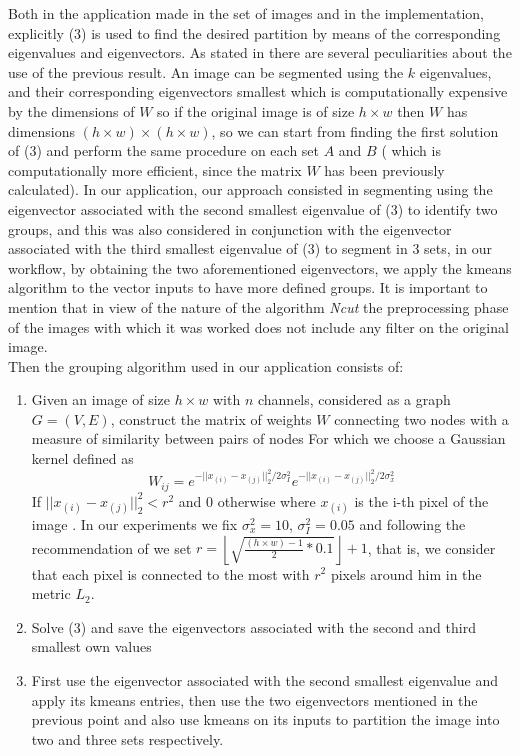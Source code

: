 \documentclass[conference]{IEEEtran}
\begin{document}
Both in the application made in the set of images and in the implementation, explicitly (3) is used to find the desired partition by means of the corresponding eigenvalues and eigenvectors. As stated in \cite{Ncut} there are several peculiarities about the use of the previous result. An image can be segmented using the $ k $ eigenvalues, and their corresponding eigenvectors smallest which is computationally expensive by the dimensions of $ W $ so if the original image is of size $ h \times w $ then $ W $ has dimensions $ (h \times w) \times (h \times w) $, so we can start from finding the first solution of (3) and perform the same procedure on each set $ A $ and $ B $ ( which is computationally more efficient, since the matrix $W $ has been previously calculated). In our application, our approach consisted in segmenting using the eigenvector associated with the second smallest eigenvalue of (3) to identify two groups, and this was also considered in conjunction with the eigenvector associated with the third smallest eigenvalue of (3) to segment in 3 sets, in our workflow, by obtaining the two aforementioned eigenvectors, we apply the kmeans algorithm to the vector inputs to have more defined groups. It is important to mention that in view of the nature of the algorithm  \textit{Ncut}  the preprocessing phase of the images with which it was worked does not include any filter on the original image. \\
Then the grouping algorithm used in our application consists of: \\
\begin{enumerate}
\item Given an image of size $h \times w$ with $n$ channels, considered as a graph $G = (V, E)$, construct the matrix of weights $W$ connecting two nodes with a measure of similarity between pairs of nodes For which we choose a Gaussian kernel defined as
\[
W_{ij}= e^{-||x_{(i)}-x_{(j)}||^2_2/2\sigma^2_I}e^{-||x_{(i)}-x_{(j)}||^2_2/2\sigma_x^2}
\]
If $ || x _ {(i)} - x _ {(j)} || _2 ^ 2 <r ^ 2 $ and 0 otherwise where $ x_ {(i)} $ is the i-th pixel of the image . In our experiments we fix $ \sigma_x ^ 2 = 10 $, $ \sigma_I ^ 2 = 0.05 $ and following the recommendation of \cite {Ncut} we set $ r = \left \lfloor
 \sqrt {\frac {(h \times w) -1} {2} * 0.1} \right \rfloor +1 $, that is, we consider that each pixel is connected to the most with $ r ^ 2 $ pixels around him in the metric $ L_2 $. \\
\item Solve (3) and save the eigenvectors associated with the second and third smallest own values
\item First use the eigenvector associated with the second smallest eigenvalue and apply its kmeans entries, then use the two eigenvectors mentioned in the previous point and also use kmeans on its inputs to partition the image into two and three sets respectively.
\end{enumerate}
\end{document}
